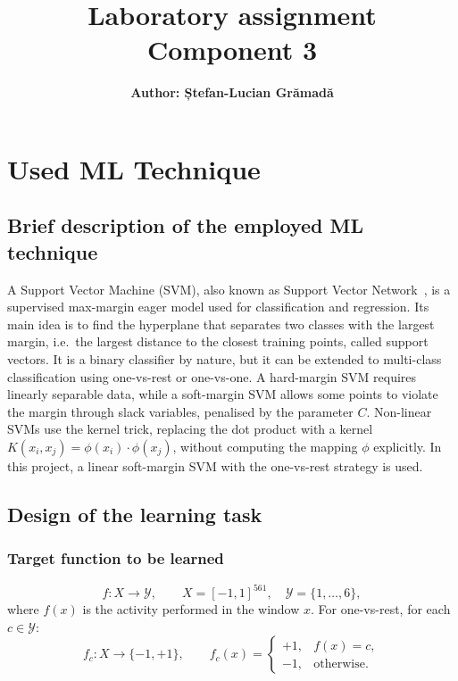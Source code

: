 \documentclass[a4paper, 11pt]{article}
\title{\textbf{Laboratory assignment} \\[1ex] \large \textbf{Component 3}}
\author{\textbf{Author: Ștefan-Lucian Grămadă}}
\begin{document}
\maketitle

\section{Used ML Technique}

\subsection{Brief description of the employed ML technique}

A Support Vector Machine (SVM), also known as Support Vector Network~\cite{cortes1995}, is a supervised max-margin eager model used for classification and regression. Its main idea is to find the hyperplane that separates two classes with the largest margin, i.e.\ the largest distance to the closest training points, called support vectors. It is a binary classifier by nature, but it can be extended to multi-class classification using one-vs-rest or one-vs-one. A hard-margin SVM requires linearly separable data, while a soft-margin SVM allows some points to violate the margin through slack variables, penalised by the parameter $C$. Non-linear SVMs use the kernel trick, replacing the dot product with a kernel $K(x_i, x_j) = \phi(x_i) \cdot \phi(x_j)$, without computing the mapping $\phi$ explicitly. In this project, a linear soft-margin SVM with the one-vs-rest strategy is used.

\subsection{Design of the learning task}

\subsubsection{Target function to be learned}

\[
  f : X \rightarrow \mathcal{Y}, \qquad X = [-1, 1]^{561}, \quad \mathcal{Y} = \{1, \dots, 6\},
\]
where $f(x)$ is the activity performed in the window $x$. For one-vs-rest, for each $c \in \mathcal{Y}$:
\[
  f_c : X \rightarrow \{-1, +1\}, \qquad
  f_c(x) = \begin{cases} +1, & f(x) = c,\\ -1, & \text{otherwise}. \end{cases}
\]
\end{document}
